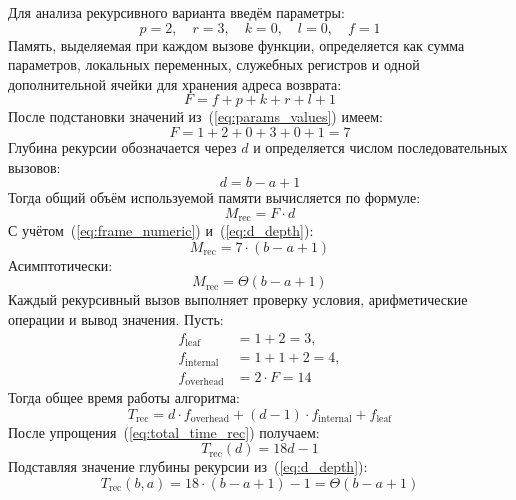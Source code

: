 Для анализа рекурсивного варианта введём параметры:
\begin{equation}
	\label{eq:params_values}
	p = 2, \quad r = 3, \quad k = 0, \quad l = 0, \quad f = 1
\end{equation}
Память, выделяемая при каждом вызове функции, определяется как сумма параметров, локальных переменных, служебных регистров и одной дополнительной ячейки для хранения адреса возврата:
\begin{equation}
	\label{eq:frame_size}
	F = f + p + k + r + l + 1
\end{equation}
После подстановки значений из~(\ref{eq:params_values}) имеем:
\begin{equation}
	\label{eq:frame_numeric}
	F = 1 + 2 + 0 + 3 + 0 + 1 = 7
\end{equation}
Глубина рекурсии обозначается через $d$ и определяется числом последовательных вызовов:
\begin{equation}
	\label{eq:d_depth}
	d = b - a + 1
\end{equation}
Тогда общий объём используемой памяти вычисляется по формуле:
\begin{equation}
	\label{eq:stack_total}
	M_{\text{rec}} = F \cdot d
\end{equation}
С учётом~(\ref{eq:frame_numeric}) и~(\ref{eq:d_depth}):
\begin{equation}
	\label{eq:stack_subst}
	M_{\text{rec}} = 7 \cdot (b - a + 1)
\end{equation}
Асимптотически:
\begin{equation}
	\label{eq:M_rec_asymp}
	M_{\text{rec}} = \Theta(b - a + 1)
\end{equation}
Каждый рекурсивный вызов выполняет проверку условия, арифметические операции и вывод значения. Пусть:
\begin{align}
	\label{eq:f_leaf_def}
	f_{\text{leaf}} &= 1 + 2 = 3,\\
	\label{eq:f_internal_def}
	f_{\text{internal}} &= 1 + 1 + 2 = 4,\\
	\label{eq:f_overhead_def}
	f_{\text{overhead}} &= 2 \cdot F = 14
\end{align}
Тогда общее время работы алгоритма:
\begin{equation}
	\label{eq:total_time_rec}
	T_{\text{rec}} = d \cdot f_{\text{overhead}} + (d - 1) \cdot f_{\text{internal}} + f_{\text{leaf}}
\end{equation}
После упрощения~(\ref{eq:total_time_rec}) получаем:
\begin{equation}
	\label{eq:total_time_numeric}
	T_{\text{rec}}(d) = 18d - 1
\end{equation}
Подставляя значение глубины рекурсии из~(\ref{eq:d_depth}):
\begin{equation}
	\label{eq:T_rec_final}
	T_{\text{rec}}(b, a) = 18 \cdot (b - a + 1) - 1 = \Theta(b - a + 1)
\end{equation}

